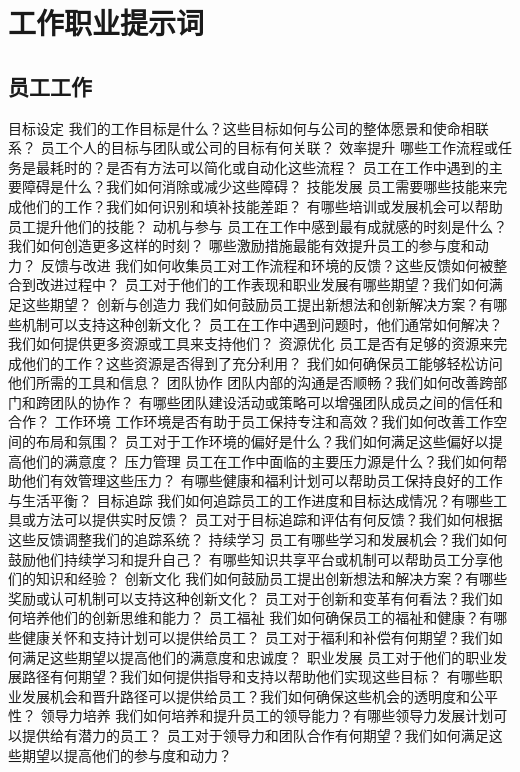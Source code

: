 \documentclass[12pt]{book}
\begin{document}
\chapter{工作职业提示词}
\section{员工工作}
目标设定
我们的工作目标是什么？这些目标如何与公司的整体愿景和使命相联系？
员工个人的目标与团队或公司的目标有何关联？
效率提升
哪些工作流程或任务是最耗时的？是否有方法可以简化或自动化这些流程？
员工在工作中遇到的主要障碍是什么？我们如何消除或减少这些障碍？
技能发展
员工需要哪些技能来完成他们的工作？我们如何识别和填补技能差距？
有哪些培训或发展机会可以帮助员工提升他们的技能？
动机与参与
员工在工作中感到最有成就感的时刻是什么？我们如何创造更多这样的时刻？
哪些激励措施最能有效提升员工的参与度和动力？
反馈与改进
我们如何收集员工对工作流程和环境的反馈？这些反馈如何被整合到改进过程中？
员工对于他们的工作表现和职业发展有哪些期望？我们如何满足这些期望？
创新与创造力
我们如何鼓励员工提出新想法和创新解决方案？有哪些机制可以支持这种创新文化？
员工在工作中遇到问题时，他们通常如何解决？我们如何提供更多资源或工具来支持他们？
资源优化
员工是否有足够的资源来完成他们的工作？这些资源是否得到了充分利用？
我们如何确保员工能够轻松访问他们所需的工具和信息？
团队协作
团队内部的沟通是否顺畅？我们如何改善跨部门和跨团队的协作？
有哪些团队建设活动或策略可以增强团队成员之间的信任和合作？
工作环境
工作环境是否有助于员工保持专注和高效？我们如何改善工作空间的布局和氛围？
员工对于工作环境的偏好是什么？我们如何满足这些偏好以提高他们的满意度？
压力管理
员工在工作中面临的主要压力源是什么？我们如何帮助他们有效管理这些压力？
有哪些健康和福利计划可以帮助员工保持良好的工作与生活平衡？
目标追踪
我们如何追踪员工的工作进度和目标达成情况？有哪些工具或方法可以提供实时反馈？
员工对于目标追踪和评估有何反馈？我们如何根据这些反馈调整我们的追踪系统？
持续学习
员工有哪些学习和发展机会？我们如何鼓励他们持续学习和提升自己？
有哪些知识共享平台或机制可以帮助员工分享他们的知识和经验？
创新文化
我们如何鼓励员工提出创新想法和解决方案？有哪些奖励或认可机制可以支持这种创新文化？
员工对于创新和变革有何看法？我们如何培养他们的创新思维和能力？
员工福祉
我们如何确保员工的福祉和健康？有哪些健康关怀和支持计划可以提供给员工？
员工对于福利和补偿有何期望？我们如何满足这些期望以提高他们的满意度和忠诚度？
职业发展
员工对于他们的职业发展路径有何期望？我们如何提供指导和支持以帮助他们实现这些目标？
有哪些职业发展机会和晋升路径可以提供给员工？我们如何确保这些机会的透明度和公平性？
领导力培养
我们如何培养和提升员工的领导能力？有哪些领导力发展计划可以提供给有潜力的员工？
员工对于领导力和团队合作有何期望？我们如何满足这些期望以提高他们的参与度和动力？
\end{document}
